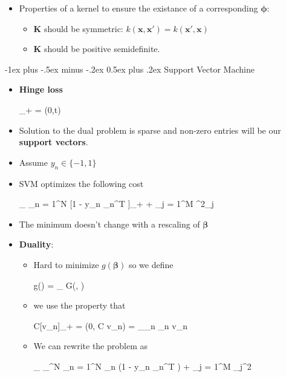 \documentclass[10pt,a4paper,landscape]{article}
\makeatletter
\renewcommand{\section}{\@startsection{section}{1}{0mm}%
                                {-1ex plus -.5ex minus -.2ex}%
                                {0.5ex plus .2ex}%
                                {\normalfont\large\bfseries}}
\def\*#1{\mathbf{#1}}
\newenvironment{myalign*}{%
  \setlength{\abovedisplayskip}{8pt}%
  \setlength{\belowdisplayskip}{8pt}%
  \start@align\@ne\st@rredtrue\m@ne
}%
{\endalign}
\makeatother
\begin{document}
\begin{multicols*}{2}
\begin{itemize}
	\item Properties of a kernel to ensure the existance of a corresponding $\bm \phi$:
	\begin{itemize}
		\item $\*K$ should be symmetric: $k(\*x, \*x') = k(\*x', \*x)$
		\item $\* K$ should be positive semidefinite.
	\end{itemize}
\end{itemize}


\section{Support Vector Machine} %
\begin{itemize}
	\item \textbf{Hinge loss}
		\begin{myalign*}
		    [t]_+ = \max(0,t)
		\end{myalign*}
	\item Solution to the dual problem is sparse and non-zero entries will be our \textbf{support vectors}.
	\item Assume $y_n \in \{-1, 1\}$
	\item SVM optimizes the following cost
	\begin{myalign*}
	    \min_{\bm \beta} \sum_{n = 1}^N [1 - y_n \tilde{\bm \phi}_n^T \bm \beta]_+ +  \sum_{j = 1}^M \beta^2_j
	\end{myalign*}
	\item The minimum doesn't change with a rescaling of $\bm \beta$
	\item \textbf{Duality}:
	\begin{itemize}
		\item Hard to minimize $g(\bm \beta)$ so we define
		\begin{myalign*}
		    g(\bm \beta) = \max_{\bm \alpha} G(\bm \beta, \bm \alpha)
		\end{myalign*}
		\item we use the property that
		\begin{myalign*}
		    C[v_n]_+ = \max(0, C v_n) = \max_{\alpha_n \in [0, C]} \alpha_n v_n
		\end{myalign*}
		\item We can rewrite the problem as
		\begin{myalign*}
		    \min_{\bm \beta} \max_{\bm \alpha \in [0, C]^N} \sum_{n = 1}^N \alpha_n (1 - y_n \tilde{\bm \phi}_n^T \bm \beta) +  \sum_{j = 1}^M \beta_j^2

\end{myalign*}
\end{itemize}
\end{itemize}
\end{multicols*}
\end{document}
